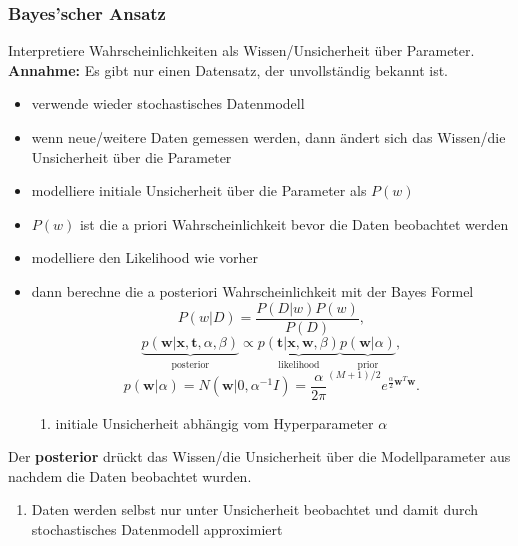 	\subsubsection{Bayes'scher Ansatz}
	Interpretiere Wahrscheinlichkeiten als Wissen/Unsicherheit über Parameter.\\[5pt]
	\textbf{Annahme:} Es gibt nur einen Datensatz, der unvollständig bekannt ist.
	\begin{itemize}
		\item verwende wieder stochastisches Datenmodell
		\item wenn neue/weitere Daten gemessen werden, dann ändert sich das Wissen/die Unsicherheit über die Parameter
		\item modelliere initiale Unsicherheit über die Parameter als $P(w)$
		\item $P(w)$ ist die a priori Wahrscheinlichkeit bevor die Daten beobachtet werden
		\item modelliere den Likelihood wie vorher
		\item dann berechne die a posteriori Wahrscheinlichkeit mit der Bayes Formel
		\begin{equation*}
			P(w\vert D) = \frac{P(D\vert w)P(w)}{P(D)},
		\end{equation*}
		\begin{equation*}
			\underbrace{p(\pmb{w}\vert \pmb{x}, \pmb{t}, \alpha, \beta)}_\text{posterior} \propto \underbrace{p(\pmb{t}\vert \pmb{x}, \pmb{w},  \beta)}_\text{likelihood} \underbrace{p(\pmb{w}\vert \alpha)}_\text{prior},
		\end{equation*}
		\begin{equation*}
			p(\pmb{w}\vert \alpha) = N(\pmb{w}\vert 0, \alpha^{-1}I) = \frac{\alpha}{2\pi}^{(M+1)/2}e^{\frac{\alpha}{2}\pmb{w}^T\pmb{w}}.
		\end{equation*}\vspace*{-5pt}
		\begin{enumerate}[$\hookrightarrow$]
			\item initiale Unsicherheit abhängig vom Hyperparameter $\alpha$
		\end{enumerate}
	\end{itemize}
	Der \textbf{posterior} drückt das Wissen/die Unsicherheit über die Modellparameter aus nachdem die Daten beobachtet wurden.\vspace*{-5pt}
	\begin{enumerate}[$\hookrightarrow$]
		\item Daten werden selbst nur unter Unsicherheit beobachtet und damit durch stochastisches Datenmodell approximiert
	\end{enumerate}
